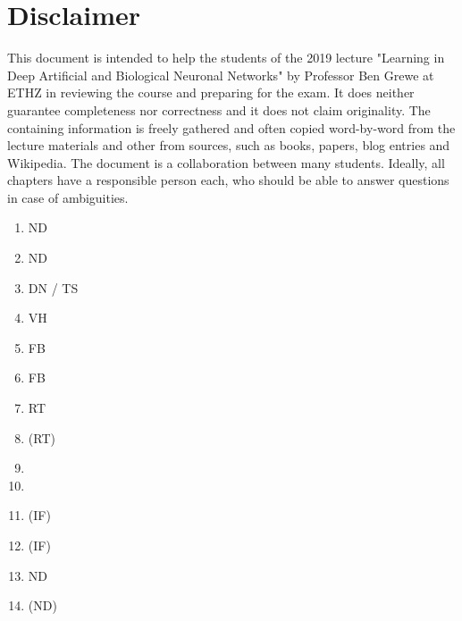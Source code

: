 \documentclass[main]{subfiles}
\begin{document}
\newpage
\section{Disclaimer}
This document is intended to help the students of the 2019 lecture "Learning in Deep Artificial and Biological Neuronal Networks" by Professor Ben Grewe at ETHZ in reviewing the course and preparing for the exam. It does neither guarantee completeness nor correctness and it does not claim originality. The containing information is freely gathered and often copied word-by-word from the lecture materials and other from sources, such as books, papers, blog entries and Wikipedia. The document is a collaboration between many students. Ideally, all chapters have a responsible person each, who should be able to answer questions in case of ambiguities. 
\begin{enumerate}
    \item ND
    \item ND
    \item DN / TS
    \item VH
    \item FB
    \item FB
    \item RT
    \item (RT)
    \item
    \item
    \item (IF)
    \item (IF)
    \item ND
    \item (ND)
    
\end{enumerate}
\end{document}
